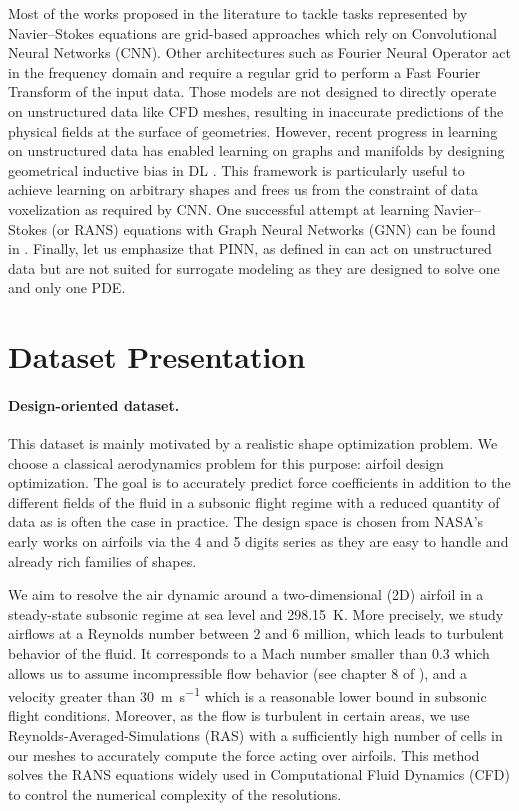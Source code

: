 Most of the works proposed in the literature to tackle tasks represented by Navier–Stokes equations are grid-based approaches \cite{um2020sol,thuerey2020deepFlowPred,mohan2020embedding,wandel2021learning,10.1145/3392717.3392772,gupta2021multiwaveletbased, tfnet} which rely on Convolutional Neural Networks (CNN). Other architectures such as Fourier Neural Operator \cite{fno} act in the frequency domain and require a regular grid to perform a Fast Fourier Transform of the input data. Those models are not designed to directly operate on unstructured data like CFD meshes, resulting in inaccurate predictions of the physical fields at the surface of geometries. However, recent progress in learning on unstructured data \cite{DBLP:journals/spm/BronsteinBLSV17} has enabled learning on graphs and manifolds by designing geometrical inductive bias in DL \cite{1555942,4700287,Li2016GatedGS,Kipf:2016tc,pmlr-v80-sanchez-gonzalez18a}. This framework is particularly useful to achieve learning on arbitrary shapes and frees us from the constraint of data voxelization as required by CNN. One successful attempt at learning Navier–Stokes (or RANS) equations with Graph Neural Networks (GNN) can be found in \cite{pfaff2021learning}. Finally, let us emphasize that PINN, as defined in \cite{pinns} can act on unstructured data but are not suited for surrogate modeling as they are designed to solve one and only one PDE.

\section{Dataset Presentation} \label{sec:dataset}
\paragraph{Design-oriented dataset.} This dataset is mainly motivated by a realistic shape optimization problem. We choose a classical aerodynamics problem for this purpose: airfoil design optimization. The goal is to accurately predict force coefficients in addition to the different fields of the fluid in a subsonic flight regime with a reduced quantity of data as is often the case in practice. The design space is chosen from NASA's early works on airfoils via the 4 and 5 digits series \cite{naca} as they are easy to handle and already rich families of shapes.

We aim to resolve the air dynamic around a two-dimensional (2D) airfoil in a steady-state subsonic regime at sea level and \SI{298.15}{\kelvin}. More precisely, we study airflows at a Reynolds number between 2 and 6 million, which leads to turbulent behavior of the fluid. It corresponds to a Mach number smaller than 0.3 which allows us to assume incompressible flow behavior (see chapter 8 of \cite{aero}), and a velocity greater than \SI{30}{\meter\per\second} which is a reasonable lower bound in subsonic flight conditions. Moreover, as the flow is turbulent in certain areas, we use Reynolds-Averaged-Simulations (RAS) with a sufficiently high number of cells in our meshes to accurately compute the force acting over airfoils. This method solves the RANS equations widely used in Computational Fluid Dynamics (CFD) to control the numerical complexity of the resolutions.

